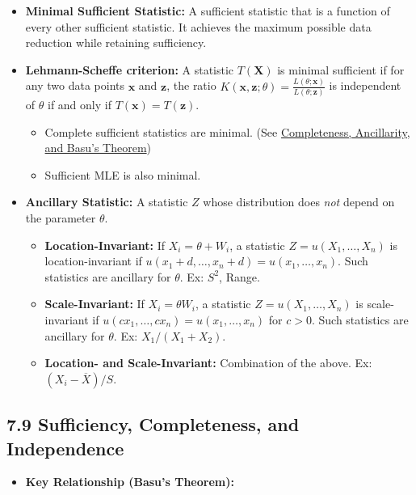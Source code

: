 \begin{itemize}
	\item \textbf{Minimal Sufficient Statistic:} A sufficient statistic that is a function of every other sufficient statistic. It achieves the maximum possible data reduction while retaining sufficiency.
	\item \textbf{Lehmann-Scheffe criterion:} A statistic $T(\mathbf{X})$ is minimal sufficient if for any two data points $\mathbf{x}$ and $\mathbf{z}$, the ratio $K(\mathbf{x}, \mathbf{z}; \theta) = \frac{L(\theta; \mathbf{x})}{L(\theta; \mathbf{z})}$ is independent of $\theta$ if and only if $T(\mathbf{x}) = T(\mathbf{z})$.
	\begin{itemize}
		\item Complete sufficient statistics are minimal. (See \href{https://stat210a.berkeley.edu/fall-2024/reader/completeness.html#complete-sufficient-statistics-are-minimal}{Completeness, Ancillarity, and Basu’s Theorem})
		\item Sufficient MLE is also minimal.
	\end{itemize}
	\item \textbf{Ancillary Statistic:} A statistic $Z$ whose distribution does \textit{not} depend on the parameter $\theta$.
	\begin{itemize}
		\item \textbf{Location-Invariant:} If $X_i = \theta + W_i$, a statistic $Z=u(X_1, \dots, X_n)$ is location-invariant if $u(x_1+d, \dots, x_n+d) = u(x_1, \dots, x_n)$. Such statistics are ancillary for $\theta$. Ex: $S^2$, Range.
		\item \textbf{Scale-Invariant:} If $X_i = \theta W_i$, a statistic $Z=u(X_1, \dots, X_n)$ is scale-invariant if $u(cx_1, \dots, cx_n) = u(x_1, \dots, x_n)$ for $c>0$. Such statistics are ancillary for $\theta$. Ex: $X_1/(X_1+X_2)$.
		\item \textbf{Location- and Scale-Invariant:} Combination of the above. Ex: $(X_i-\overline{X})/S$.
	\end{itemize}
\end{itemize}

\subsection{7.9 Sufficiency, Completeness, and Independence}

\begin{itemize}
	\item \textbf{Key Relationship (Basu's Theorem):}
\end{itemize}

